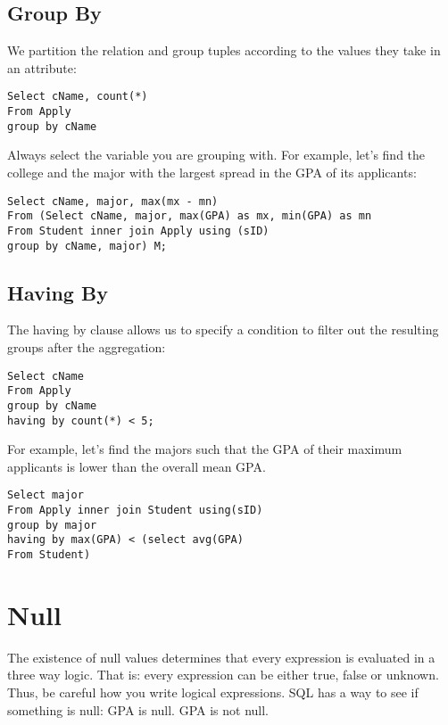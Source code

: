 \documentclass[11pt, oneside]{article}   	%
\begin{document}
\subsection{Group By}

We partition the relation and group tuples according to the values they take in an attribute:

\begin{lstlisting}
Select cName, count(*)
From Apply
group by cName
\end{lstlisting}

Always select the variable you are grouping with. For example, let's find the college and the major with the largest spread in the GPA of its applicants:

\begin{lstlisting}
Select cName, major, max(mx - mn)
From (Select cName, major, max(GPA) as mx, min(GPA) as mn
From Student inner join Apply using (sID)
group by cName, major) M;
\end{lstlisting}

\subsection{Having By}

The having by clause allows us to specify a condition to filter out the resulting groups after the aggregation:

\begin{lstlisting}
Select cName
From Apply
group by cName
having by count(*) < 5;
\end{lstlisting}

For example, let's find the majors such that the GPA of their maximum applicants is lower than the overall mean GPA.

\begin{lstlisting}
Select major
From Apply inner join Student using(sID)
group by major
having by max(GPA) < (select avg(GPA)
From Student)
\end{lstlisting}

\section{Null}

The existence of null values determines that every expression is evaluated in a three way logic. That is: every expression can be either true, false or unknown. Thus, be careful how you write logical expressions. SQL has a way to see if something is null: GPA is null. GPA is not null. 
\end{document}
